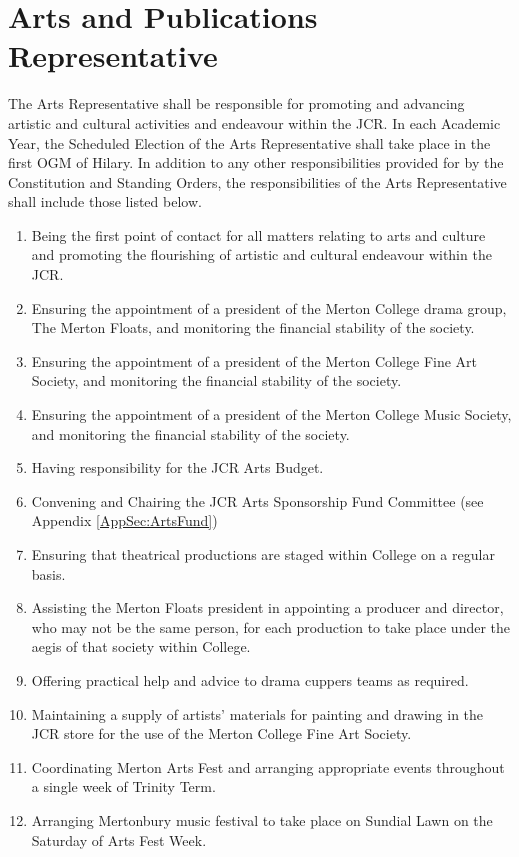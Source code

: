 \section{Arts and Publications Representative}
\npara The Arts Representative shall be responsible for promoting and advancing artistic and cultural activities and endeavour within the JCR.
\npara In each Academic Year, the Scheduled Election of the Arts Representative shall take place in the first OGM of Hilary.
\npara In addition to any other responsibilities provided for by the Constitution and Standing Orders, the responsibilities of the Arts Representative shall include those listed below.
\begin{enumerate}
	\item Being the first point of contact for all matters relating to arts and culture and promoting the flourishing of artistic and cultural endeavour within the JCR.
	\item Ensuring the appointment of a president of the Merton College drama group, The Merton Floats, and monitoring the financial stability of the society.    
	\item Ensuring the appointment of a president of the Merton College Fine Art Society, and monitoring the financial stability of the society.
	\item Ensuring the appointment of a president of the Merton College Music Society, and monitoring the financial stability of the society.
	\item Having responsibility for the JCR Arts Budget.
	\item Convening and Chairing the JCR Arts Sponsorship Fund Committee (see Appendix \ref{AppSec:ArtsFund})
	\item Ensuring that theatrical productions are staged within College on a regular basis.
	\item Assisting the Merton Floats president in appointing a producer and director, who may not be the same person, for each production to take place under the aegis of that society within College.     
	\item Offering practical help and advice to drama cuppers teams as required.
	\item Maintaining a supply of artists' materials for painting and drawing in the JCR store for the use of the Merton College Fine Art Society.
	\item Coordinating Merton Arts Fest and arranging appropriate events throughout a single week of Trinity Term.
	\item Arranging Mertonbury music festival to take place on Sundial Lawn on the Saturday of Arts Fest Week.

\end{enumerate}
